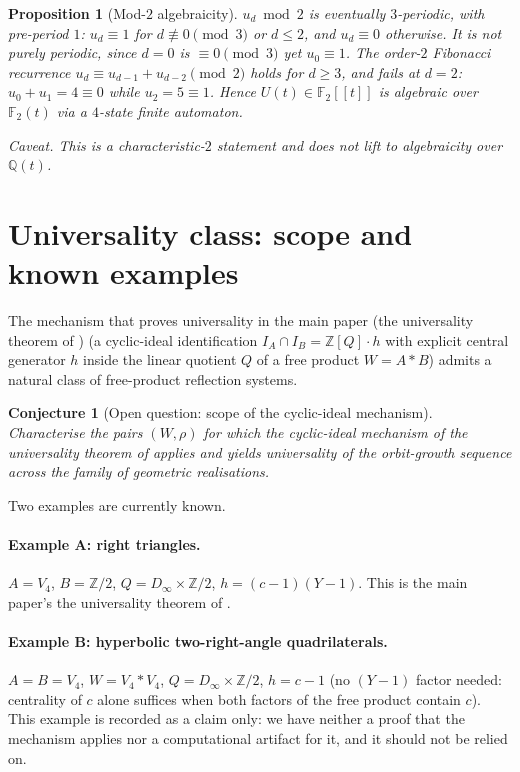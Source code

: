 \documentclass[11pt,a4paper]{article}
\newtheorem{conjecture}{Conjecture}
\newtheorem{proposition}{Proposition}
\theoremstyle{remark}
\theoremstyle{plain}
\begin{document}
\begin{proposition}[Mod-$2$ algebraicity]
\label{prop:mod2-automaton}
$u_d \bmod 2$ is \emph{eventually} $3$-periodic, with pre-period $1$:
$u_d \equiv 1$ for $d \not\equiv 0 \pmod 3$ or $d \le 2$, and
$u_d \equiv 0$ otherwise. It is not purely periodic, since $d = 0$ is
$\equiv 0 \pmod 3$ yet $u_0 \equiv 1$. The order-$2$ Fibonacci
recurrence $u_d \equiv u_{d-1} + u_{d-2} \pmod 2$ holds for $d \ge 3$,
and fails at $d = 2$: $u_0 + u_1 = 4 \equiv 0$ while $u_2 = 5 \equiv 1$.
Hence
$U(t) \in \mathbb{F}_2[[t]]$ is algebraic over $\mathbb{F}_2(t)$ via a
$4$-state finite automaton.

\emph{Caveat.}  This is a characteristic-$2$ statement and does not
lift to algebraicity over $\mathbb{Q}(t)$.
\end{proposition}

\section{Universality class: scope and known examples}
\label{sec:universality-class}

The mechanism that proves universality in the main paper
(the universality theorem of \cite{Bonfioli2}) (a cyclic-ideal identification
$I_A \cap I_B = \mathbb{Z}[Q]\cdot h$ with explicit central generator
$h$ inside the linear quotient $Q$ of a free product $W = A * B$) admits a natural class of free-product reflection systems.

\begin{conjecture}[Open question: scope of the cyclic-ideal mechanism]
\label{conj:universality-class}
Characterise the pairs $(W, \rho)$ for which the cyclic-ideal mechanism
of the universality theorem of \cite{Bonfioli2} applies and yields universality of
the orbit-growth sequence across the family of geometric realisations.
\end{conjecture}

Two examples are currently known.

\paragraph{Example A: right triangles.}  $A = V_4$, $B = \mathbb{Z}/2$,
$Q = D_\infty \times \mathbb{Z}/2$, $h = (c-1)(Y-1)$.  This is the main
paper's the universality theorem of \cite{Bonfioli2}.

\paragraph{Example B: hyperbolic two-right-angle quadrilaterals.}
$A = B = V_4$, $W = V_4 * V_4$, $Q = D_\infty \times \mathbb{Z}/2$,
$h = c - 1$ (no $(Y-1)$ factor needed: centrality of $c$ alone suffices
when both factors of the free product contain $c$). This example is
recorded as a claim only: we have neither a proof that the mechanism
applies nor a computational artifact for it, and it should not be relied
on.
\end{document}
